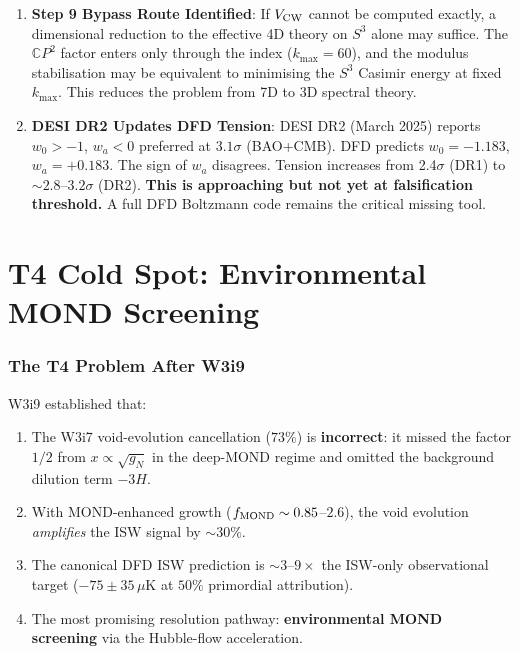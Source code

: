 \documentclass[11pt,a4paper]{article}
\newcommand{\CP}{\mathbb{C}P}
\begin{document}
\begin{tcolorbox}[colback=yellow!5!white, colframe=red!70!black,
  title=\textbf{TOP 5 FINDINGS --- WAVE 4, ITERATION 10}]
\begin{enumerate}
\item \textbf{Step 9 Bypass Route Identified}: If $V_{\rm CW}$
  cannot be computed exactly, a dimensional reduction to the effective
  4D theory on $S^3$ alone may suffice. The $\CP^2$ factor enters
  only through the index ($k_{\max} = 60$), and the modulus
  stabilisation may be equivalent to minimising the $S^3$ Casimir
  energy at fixed $k_{\max}$. This reduces the problem from 7D to 3D
  spectral theory.

\item \textbf{DESI DR2 Updates DFD Tension}: DESI DR2 (March 2025)
  reports $w_0 > -1$, $w_a < 0$ preferred at $3.1\sigma$ (BAO+CMB).
  DFD predicts $w_0 = -1.183$, $w_a = +0.183$. The sign of $w_a$
  disagrees. Tension increases from 2.4$\sigma$ (DR1) to
  $\sim 2.8$--$3.2\sigma$ (DR2). \textbf{This is approaching but
  not yet at falsification threshold.} A full DFD Boltzmann code
  remains the critical missing tool.
\end{enumerate}

\end{tcolorbox}

\part{T4 Cold Spot: Environmental MOND Screening}
\label{part:T4}

\section{The T4 Problem After W3i9}
\label{sec:T4-status}

W3i9 established that:
\begin{enumerate}[nosep]
\item The W3i7 void-evolution cancellation ($73\%$) is \textbf{incorrect}:
  it missed the factor $1/2$ from $x \propto \sqrt{g_N}$ in the
  deep-MOND regime and omitted the background dilution term $-3H$.
\item With MOND-enhanced growth ($f_{\rm MOND} \sim 0.85$--$2.6$),
  the void evolution \emph{amplifies} the ISW signal by $\sim 30\%$.
\item The canonical DFD ISW prediction is $\sim 3$--$9\times$ the
  ISW-only observational target ($-75 \pm 35\,\mu$K at $50\%$
  primordial attribution).
\item The most promising resolution pathway: \textbf{environmental
  MOND screening} via the Hubble-flow acceleration.
\end{enumerate}
\end{document}
